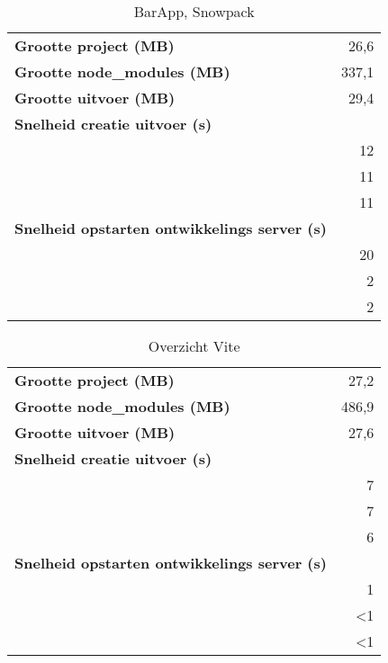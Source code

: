         \begin{table}[h]
            \centering
            \begin{tabular}{lr}
            \textbf{Grootte project (MB)} & 26,6 \\
            \textbf{Grootte node\_modules (MB)} & 337,1 \\
            \textbf{Grootte uitvoer (MB)} & 29,4 \\
            \textbf{Snelheid creatie uitvoer (s)} & \\
            \textbf{} & 12 \\
            \textbf{} & 11 \\
            \textbf{} & 11 \\
            \textbf{Snelheid opstarten ontwikkelings server (s)} & \\
            \textbf{} & 20 \\
            \textbf{} & 2 \\
            \textbf{} & 2
            \end{tabular}
            \caption{BarApp, Snowpack}
            \end{table}
 
            \begin{table}[h]
                \centering
                \begin{tabular}{lr}
                \textbf{Grootte project (MB)} & 27,2 \\
                \textbf{Grootte node\_modules (MB)} & 486,9 \\
                \textbf{Grootte uitvoer (MB)} & 27,6 \\
                \textbf{Snelheid creatie uitvoer (s)} & \\
                \textbf{} & 7 \\
                \textbf{} & 7 \\
                \textbf{} & 6 \\
                \textbf{Snelheid opstarten ontwikkelings server (s)} & \\
                \textbf{} & 1 \\
                \textbf{} & <1 \\
                \textbf{} & <1
                \end{tabular}
                \caption{Overzicht Vite}
                \end{table}
